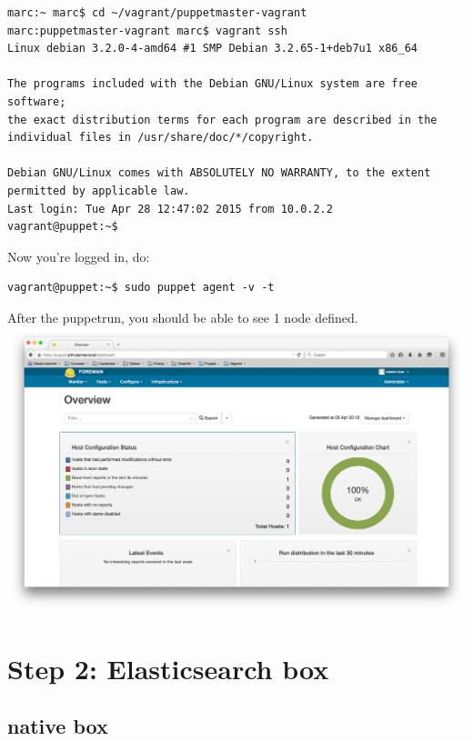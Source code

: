 \documentclass{article}
\begin{document}
\begin{verbatim}
marc:~ marc$ cd ~/vagrant/puppetmaster-vagrant
marc:puppetmaster-vagrant marc$ vagrant ssh
Linux debian 3.2.0-4-amd64 #1 SMP Debian 3.2.65-1+deb7u1 x86_64

The programs included with the Debian GNU/Linux system are free software;
the exact distribution terms for each program are described in the
individual files in /usr/share/doc/*/copyright.

Debian GNU/Linux comes with ABSOLUTELY NO WARRANTY, to the extent
permitted by applicable law.
Last login: Tue Apr 28 12:47:02 2015 from 10.0.2.2
vagrant@puppet:~$
\end{verbatim}

\par Now you're logged in, do:\\
\begin{verbatim}
vagrant@puppet:~$ sudo puppet agent -v -t
\end{verbatim}

After the puppetrun, you should be able to see 1 node defined.\\
\includegraphics[scale=0.3]{images/dashboard}

\section{Step 2: Elasticsearch box}
\subsection{native box}
\end{document}
